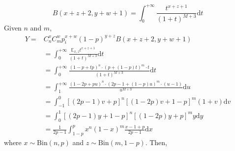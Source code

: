 \documentclass{article}
\begin{document}
\begin{equation}
B(x+z+2, y+w+1) = \int_{0}^{+\infty} \frac{t^{x+z+1}}{(1+t)^{M+3}}\mathrm{d}t
\end{equation}
Given $n$ and $m$, 
\begin{equation}
\begin{split}
Y=&C_{n}^{x}C_{m}^{w}p_i^{x+w}(1-p)^{y+z}B(x+z+2,y+w+1)\\
&= \int_{0}^{+\infty} \frac{\mathbb{E}_{x,z}t^{x+z+1}}{(1+t)^{M+3}}\mathrm{d}t\\
&=\int_{0}^{+\infty} \frac{(1-p+tp)^n\cdot (p+(1-p)t)^m\cdot t}{(1+t)^{M+3}}\mathrm{d}t\\
&=\int_{1}^{+\infty} \frac{(1-2p+pu)^n\cdot (2p-1+(1-p)u)^m\cdot (u-1)}{u^{M+3}}\mathrm{d}u\\
&=\int_{-1}^{0}[(2p-1)v+p]^{n}[(1-2p)v+1-p]^{m}(1+v)\mathrm{d}v\\
&=\int_{0}^{1}[(2p-1)y+1-p]^{n}[(1-2p)y+p]^{m}y\mathrm{d}y\\
&=\frac{1}{2p-1}\int_{1-p}^{p}x^n(1-x)^m\frac{x-1+p}{2p-1}\mathrm{d}x
\end{split}
\end{equation}
where $x\sim \mathrm{Bin}(n,p)$ and $z\sim \mathrm{Bin}(m,1-p)$. Then,
\end{document}
